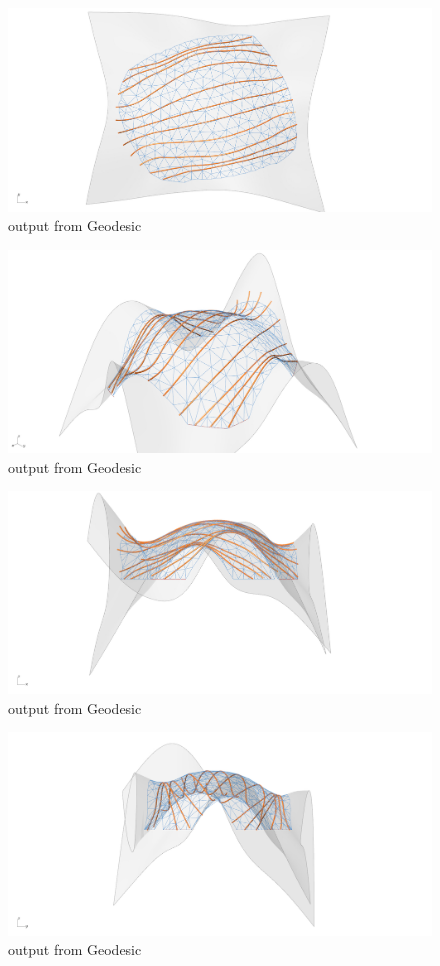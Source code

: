 \begin{figure}[H]
\centering
\includegraphics[height=0.4\linewidth ]{figure/Results/geotop.jpg}
\caption{output from Geodesic}
\end{figure}
\begin{figure}[H]
\centering
\includegraphics[height=0.4\linewidth ]{figure/Results/GeoPerspective.jpg}
\caption{output from Geodesic}
\end{figure}
\begin{figure}[H]
\centering
\includegraphics[height=0.4\linewidth ]{figure/Results/geofront.jpg}
\caption{output from Geodesic}
\end{figure}
\begin{figure}[H]
\centering
\includegraphics[height=0.4\linewidth ]{figure/Results/geoRight.jpg}
\caption{output from Geodesic}
\end{figure}